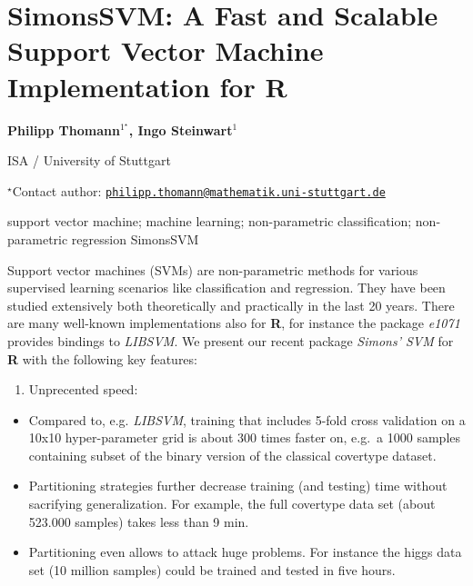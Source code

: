 \documentclass[\main/boa.tex]{subfiles}
\begin{document}
\section{SimonsSVM: A Fast and Scalable Support Vector Machine Implementation for
R}

\begin{center}
  {\bf Philipp Thomann$^{1^\star}$, Ingo Steinwart$^{1}$}
\end{center}

\vskip 0.3cm

\begin{affiliations}
\begin{enumerate}
\begin{minipage}{0.915\textwidth}
\centering
\item ISA / University of Stuttgart \\[-2pt]
\end{minipage}
\end{enumerate}
$^\star$Contact author: \href{mailto:philipp.thomann@mathematik.uni-stuttgart.de}{\nolinkurl{philipp.thomann@mathematik.uni-stuttgart.de}}\\
\end{affiliations}

\vskip 0.5cm

\begin{minipage}{0.915\textwidth}
\keywords support vector machine; machine learning; non-parametric classification;
non-parametric regression
\packages SimonsSVM
\end{minipage}

\vskip 0.8cm

Support vector machines (SVMs) are non-parametric methods for various
supervised learning scenarios like classification and regression. They
have been studied extensively both theoretically and practically in the
last 20 years. There are many well-known implementations also for
\textbf{R}, for instance the package \emph{e1071} provides bindings to
\emph{LIBSVM}. We present our recent package \emph{Simons' SVM} for
\textbf{R} with the following key features:

\begin{enumerate}
\def\labelenumi{\arabic{enumi}.}
\tightlist
\item
  Unprecented speed:
\end{enumerate}

\begin{itemize}
\tightlist
\item
  Compared to, e.g. \emph{LIBSVM}, training that includes 5-fold cross
  validation on a 10x10 hyper-parameter grid is about 300 times faster
  on, e.g.~a 1000 samples containing subset of the binary version of the
  classical covertype dataset.
\item
  Partitioning strategies further decrease training (and testing) time
  without sacrifying generalization. For example, the full covertype
  data set (about 523.000 samples) takes less than 9 min.
\item
  Partitioning even allows to attack huge problems. For instance the
  higgs data set (10 million samples) could be trained and tested in
  five hours.
\end{itemize}
\end{document}
